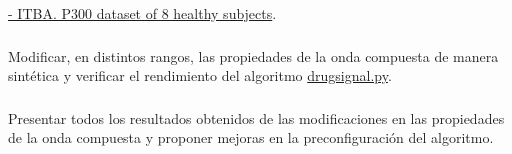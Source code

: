 \documentclass[../00_Main.tex]{subfiles}
\begin{document}
\hspace{2cm}\href{https://www.kaggle.com/datasets/rramele/p300samplingdataset?resource=download}{- ITBA. P300 dataset of 8 healthy subjects}.

\subsubsection{} Modificar, en distintos rangos, las propiedades de la onda compuesta de manera sintética y verificar el rendimiento del algoritmo \href{https://github.com/faturita/python-nerv/blob/master/DrugSignal.py}{drugsignal.py}.


\subsubsection{} Presentar todos los resultados obtenidos de las modificaciones en las propiedades de la onda compuesta y proponer mejoras en la preconfiguración del algoritmo.


\biblio %
\end{document}
